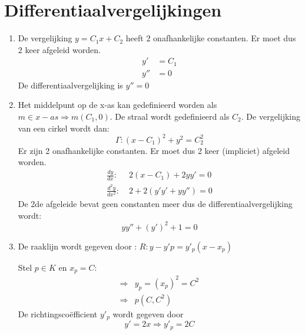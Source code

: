 \chapter{Differentiaalvergelijkingen}
{
\begin{enumerate}
\item De vergelijking $y = C_1x + C_2$ heeft 2 onafhankelijke constanten. Er moet dus 2 keer afgeleid worden.
\begin{equation*}
\begin{split}
y' & = C_1 \\
y'' & = 0
\end{split}
\end{equation*}
De differentiaalvergelijking is $y'' = 0$
\item Het middelpunt op de x-as kan gedefinieerd worden als $m \in x-as \Rightarrow m(C_1, 0)$. De straal wordt gedefinieerd als $C_2$. De vergelijking van een cirkel wordt dan:
$$\Gamma: (x - C_1)^2 + y^2 = C_2^2$$
Er zijn 2 onafhankelijke constanten. Er moet dus 2 keer (impliciet) afgeleid worden.
\begin{equation*}
\begin{split}
\frac{dy}{dx} :\; & 2(x - C_1) + 2yy' = 0 \\
\frac{d^2y}{dx^2} :\; & 2 + 2(y'y' + yy'') = 0
\end{split}
\end{equation*}
De 2de afgeleide bevat geen constanten meer dus de differentiaalvergelijking wordt: 
$$yy'' + (y')^2 + 1 = 0$$
\item De raaklijn wordt gegeven door : $R: y - y'p = y'_p(x - x_p)$

Stel $p \in K$ en $x_p = C$:
\begin{equation*}
\begin{split}
\Rightarrow & y_p = (x_p)^2 = C^2 \\
\Rightarrow & p(C, C^2)
\end{split}
\end{equation*}
De richtingscoëfficient $y'_p$ wordt gegeven door 
$$y'= 2x \Rightarrow y'_p = 2C$$


\end{enumerate}}
